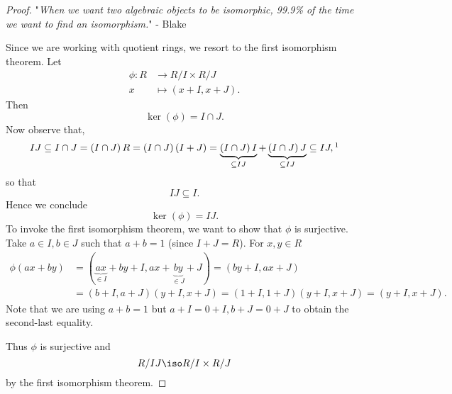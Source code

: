 \documentclass[pmath441]{subfiles}
\begin{document}
    \begin{proof}
        "\textit{When we want two algebraic objects to be isomorphic, 99.9\% of the time we want to find an isomorphism.}" - Blake

        Since we are working with quotient rings, we resort to the first isomorphism theorem. Let
        \begin{equation*}
            \begin{aligned}
                \phi:R&\to R /I\times R /J \\
                x & \mapsto \left( x+I,x+J \right).
            \end{aligned} 
        \end{equation*}
        Then
        \begin{equation*}
            \ker\left( \phi \right) = I\cap J.
        \end{equation*}
        Now observe that,
        \begin{equation*}
            IJ\subseteq I\cap J = \left( I\cap J \right)R = \left( I\cap J \right)\left( I+J \right) = \underbrace{\left( I\cap J \right)I}_{\subseteq IJ} + \underbrace{\left( I\cap J \right)J}_{\subseteq IJ} \subseteq IJ,\footnotemark[1]
        \end{equation*} 
        so that
        \begin{equation*}
            IJ \subseteq I.
        \end{equation*}
        Hence we conclude
        \begin{equation*}
            \ker\left( \phi \right) = IJ.
        \end{equation*}
        To invoke the first isomorphism theorem, we want to show that $\phi$ is surjective. Take $a\in I, b\in J$ such that $a+b = 1$ (since $I+J=R$). For $x,y\in R$
        \begin{equation*}
            \begin{aligned}
                \phi\left( ax+by \right) & = \left( \underbrace{ax}_{\in I}+by+I,ax+\underbrace{by}_{\in J}+J \right) = \left( by+I,ax+J \right) \\
                                         & = \left( b+I,a+J \right)\left( y+I,x+J \right) = \left( 1+I,1+J \right)\left( y+I,x+J \right) = \left( y+I,x+J \right).
            \end{aligned} 
        \end{equation*}
        Note that we are using $a+b=1$ but $a+I=0+I, b+J=0+J$ to obtain the second-last equality.

        Thus $\phi$ is surjective and
        \begin{equation*}
            R /IJ \iso R /I\times R /J
        \end{equation*}
        by the first isomorphism theorem.
        
        \noindent
        \begin{minipage}{\textwidth}
        \end{minipage}
    \end{proof}
    
\end{document}
